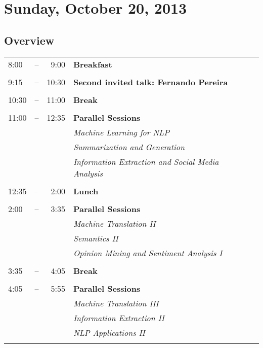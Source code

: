 \documentclass[twoside,makeidx]{book}
\begin{document}
\chapter{Sunday, October 20, 2013}
\section*{Overview}
\begin{tabular}{ l @{} c @{} r l l }
8:00 & -- & 9:00 & \textbf{Breakfast} \hfill \\
\\
9:15 & -- & 10:30 & \textbf{Second invited talk: Fernando Pereira} \hfill \\
\\
10:30 & -- & 11:00 & \textbf{Break} \hfill \\
\\
11:00 & -- & 12:35 & \textbf{Parallel Sessions} \hfill \\
 & & & \textit{Machine Learning for NLP} \\
 & & & \textit{Summarization and Generation} \\
 & & & \textit{Information Extraction and Social Media Analysis} \\
\\
12:35 & -- & 2:00 & \textbf{Lunch} \hfill \\
\\
2:00 & -- & 3:35 & \textbf{Parallel Sessions} \hfill \\
 & & & \textit{Machine Translation II} \\
 & & & \textit{Semantics II} \\
 & & & \textit{Opinion Mining and Sentiment Analysis I} \\
\\
3:35 & -- & 4:05 & \textbf{Break} \hfill \\
\\
4:05 & -- & 5:55 & \textbf{Parallel Sessions} \hfill \\
 & & & \textit{Machine Translation III} \\
 & & & \textit{Information Extraction II} \\
 & & & \textit{NLP Applications II} \\
\\
\end{tabular}
\clearpage
\end{document}
